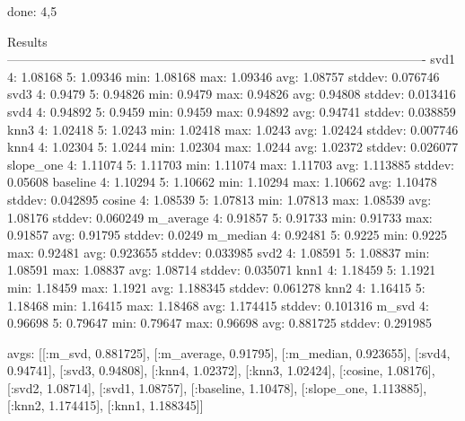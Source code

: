 done: 4,5

  Results
  ----------------------------------------------------------------------------------------------------
  svd1         	  4: 1.08168	  5: 1.09346	min: 1.08168	max: 1.09346	avg: 1.08757	stddev: 0.076746
  svd3         	  4: 0.9479	    5: 0.94826	min: 0.9479	  max: 0.94826	avg: 0.94808	stddev: 0.013416
  svd4         	  4: 0.94892	  5: 0.9459	  min: 0.9459	  max: 0.94892	avg: 0.94741	stddev: 0.038859
  knn3         	  4: 1.02418	  5: 1.0243	  min: 1.02418	max: 1.0243	  avg: 1.02424	stddev: 0.007746
  knn4         	  4: 1.02304	  5: 1.0244	  min: 1.02304	max: 1.0244	  avg: 1.02372	stddev: 0.026077
  slope_one    	  4: 1.11074	  5: 1.11703	min: 1.11074	max: 1.11703	avg: 1.113885	stddev: 0.05608
  baseline     	  4: 1.10294	  5: 1.10662	min: 1.10294	max: 1.10662	avg: 1.10478	stddev: 0.042895
  cosine       	  4: 1.08539	  5: 1.07813	min: 1.07813	max: 1.08539	avg: 1.08176	stddev: 0.060249
  m_average    	  4: 0.91857	  5: 0.91733	min: 0.91733	max: 0.91857	avg: 0.91795	stddev: 0.0249
  m_median     	  4: 0.92481	  5: 0.9225	  min: 0.9225	  max: 0.92481	avg: 0.923655	stddev: 0.033985
  svd2         	  4: 1.08591	  5: 1.08837	min: 1.08591	max: 1.08837	avg: 1.08714	stddev: 0.035071
  knn1         	  4: 1.18459	  5: 1.1921	  min: 1.18459	max: 1.1921	  avg: 1.188345	stddev: 0.061278
  knn2         	  4: 1.16415	  5: 1.18468	min: 1.16415	max: 1.18468	avg: 1.174415	stddev: 0.101316
  m_svd        	  4: 0.96698	  5: 0.79647	min: 0.79647	max: 0.96698	avg: 0.881725	stddev: 0.291985

  avgs:
  [[:m_svd, 0.881725],
   [:m_average, 0.91795],
   [:m_median, 0.923655],
   [:svd4, 0.94741],
   [:svd3, 0.94808],
   [:knn4, 1.02372],
   [:knn3, 1.02424],
   [:cosine, 1.08176],
   [:svd2, 1.08714],
   [:svd1, 1.08757],
   [:baseline, 1.10478],
   [:slope_one, 1.113885],
   [:knn2, 1.174415],
   [:knn1, 1.188345]]

